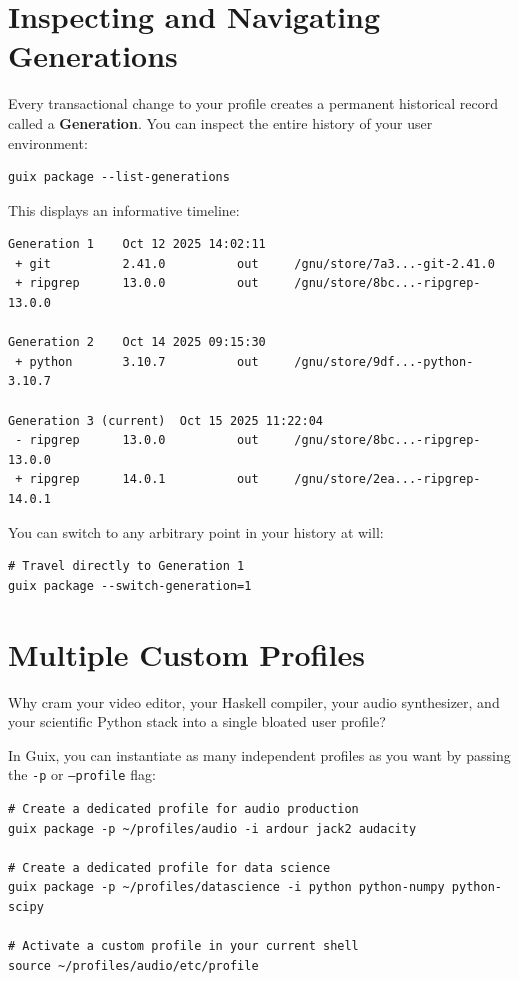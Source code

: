 \section{Inspecting and Navigating Generations}

Every transactional change to your profile creates a permanent historical record called a \textbf{Generation}. You can inspect the entire history of your user environment:

\begin{lstlisting}[style=guixcli]
guix package --list-generations
\end{lstlisting}

This displays an informative timeline:

\begin{lstlisting}[style=guixcli]
Generation 1    Oct 12 2025 14:02:11
 + git          2.41.0          out     /gnu/store/7a3...-git-2.41.0
 + ripgrep      13.0.0          out     /gnu/store/8bc...-ripgrep-13.0.0

Generation 2    Oct 14 2025 09:15:30
 + python       3.10.7          out     /gnu/store/9df...-python-3.10.7

Generation 3 (current)  Oct 15 2025 11:22:04
 - ripgrep      13.0.0          out     /gnu/store/8bc...-ripgrep-13.0.0
 + ripgrep      14.0.1          out     /gnu/store/2ea...-ripgrep-14.0.1
\end{lstlisting}

You can switch to any arbitrary point in your history at will:

\begin{lstlisting}[style=guixcli]
# Travel directly to Generation 1
guix package --switch-generation=1
\end{lstlisting}

\section{Multiple Custom Profiles}

Why cram your video editor, your Haskell compiler, your audio synthesizer, and your scientific Python stack into a single bloated user profile?

In Guix, you can instantiate as many independent profiles as you want by passing the \texttt{-p} or \texttt{--profile} flag:

\begin{lstlisting}[style=guixcli]
# Create a dedicated profile for audio production
guix package -p ~/profiles/audio -i ardour jack2 audacity

# Create a dedicated profile for data science
guix package -p ~/profiles/datascience -i python python-numpy python-scipy

# Activate a custom profile in your current shell
source ~/profiles/audio/etc/profile
\end{lstlisting}

